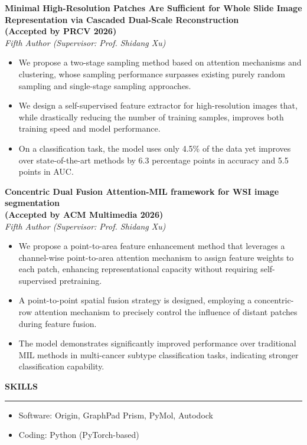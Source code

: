 \documentclass[11pt,a4paper]{article}
\newcommand{\cvsection}[1]{\vspace{0.8em}\textbf{\MakeUppercase{#1}}\par\vspace{-0.5em}\noindent\rule{\linewidth}{0.4pt}\par\vspace{-0.5em}}
\newcommand{\project}[3]{\vspace{0.8em}\textbf{#1}\\\textit{#3}\par}
\begin{document}
\project{Minimal High-Resolution Patches Are Sufficient for Whole Slide Image Representation via Cascaded Dual-Scale Reconstruction\\(Accepted by PRCV 2026)}{Xu Lab (SCUT)}{Fifth Author (Supervisor: Prof. Shidang Xu)}
\begin{itemize}
    \item We propose a two-stage sampling method based on attention mechanisms and clustering, whose sampling performance surpasses existing purely random sampling and single-stage sampling approaches.
    \item We design a self-supervised feature extractor for high-resolution images that, while drastically reducing the number of training samples, improves both training speed and model performance.
    \item On a classification task, the model uses only 4.5\% of the data yet improves over state-of-the-art methods by 6.3 percentage points in accuracy and 5.5 points in AUC.
\end{itemize}

\project{Concentric Dual Fusion Attention-MIL framework for WSI image segmentation\\(Accepted by ACM Multimedia 2026)}{Xu Lab (SCUT)}{Fifth Author (Supervisor: Prof. Shidang Xu)}
\begin{itemize}
    \item We propose a point-to-area feature enhancement method that leverages a channel-wise point-to-area attention mechanism to assign feature weights to each patch, enhancing representational capacity without requiring self-supervised pretraining.
    \item A point-to-point spatial fusion strategy is designed, employing a concentric-row attention mechanism to precisely control the influence of distant patches during feature fusion.
    \item The model demonstrates significantly improved performance over traditional MIL methods in multi-cancer subtype classification tasks, indicating stronger classification capability.
\end{itemize}

\cvsection{Skills}
\vspace{0.8em}
\begin{itemize}
    \item Software: Origin, GraphPad Prism, PyMol, Autodock
    \item Coding: Python (PyTorch-based)
\end{itemize}
\end{document}
